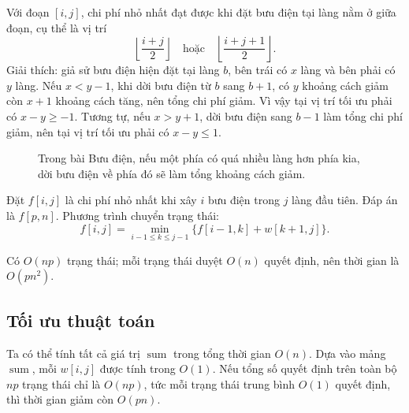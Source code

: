 \documentclass[11pt]{article}
\begin{document}
Với đoạn $[i,j]$, chi phí nhỏ nhất đạt được khi đặt bưu điện tại làng nằm ở
giữa đoạn, cụ thể là vị trí
\[
  \left\lfloor\frac{i+j}{2}\right\rfloor
  \quad\text{hoặc}\quad
  \left\lfloor\frac{i+j+1}{2}\right\rfloor.
\]
Giải thích: giả sử bưu điện hiện đặt tại làng $b$, bên trái có $x$ làng và
bên phải có $y$ làng. Nếu $x<y-1$, khi dời bưu điện từ $b$ sang $b+1$, có
$y$ khoảng cách giảm còn $x+1$ khoảng cách tăng, nên tổng chi phí giảm. Vì
vậy tại vị trí tối ưu phải có $x-y\ge -1$. Tương tự, nếu $x>y+1$, dời bưu
điện sang $b-1$ làm tổng chi phí giảm, nên tại vị trí tối ưu phải có
$x-y\le 1$.

\begin{figure}[ht]
\centering
{}
\caption{Trong bài Bưu điện, nếu một phía có quá nhiều làng hơn phía kia, dời bưu điện về phía đó sẽ làm tổng khoảng cách giảm.}
\end{figure}

Đặt $f[i,j]$ là chi phí nhỏ nhất khi xây $i$ bưu điện trong $j$ làng đầu
tiên. Đáp án là $f[p,n]$. Phương trình chuyển trạng thái:
\[
  f[i,j]=\min_{i-1\le k\le j-1}
    \{f[i-1,k]+w[k+1,j]\}.
\]

Có $O(np)$ trạng thái; mỗi trạng thái duyệt $O(n)$ quyết định, nên thời gian
là $O(pn^2)$.

\subsection*{Tối ưu thuật toán}

Ta có thể tính tất cả giá trị $\operatorname{sum}$ trong tổng thời gian
$O(n)$. Dựa vào mảng $\operatorname{sum}$, mỗi $w[i,j]$ được tính trong
$O(1)$. Nếu tổng số quyết định trên toàn bộ $np$ trạng thái chỉ là $O(np)$,
tức mỗi trạng thái trung bình $O(1)$ quyết định, thì thời gian giảm còn
$O(pn)$.
\end{document}

